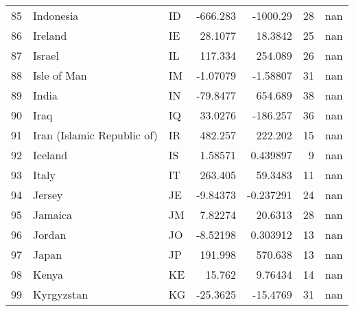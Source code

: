 \begin{tabular}{rllrrrr}
 85 & Indonesia                  & ID         & -666.283      & -1000.29      &     28 &          nan \\
 86 & Ireland                    & IE         &   28.1077     &    18.3842    &     25 &          nan \\
 87 & Israel                     & IL         &  117.334      &   254.089     &     26 &          nan \\
 88 & Isle of Man                & IM         &   -1.07079    &    -1.58807   &     31 &          nan \\
 89 & India                      & IN         &  -79.8477     &   654.689     &     38 &          nan \\
 90 & Iraq                       & IQ         &   33.0276     &  -186.257     &     36 &          nan \\
 91 & Iran (Islamic Republic of) & IR         &  482.257      &   222.202     &     15 &          nan \\
 92 & Iceland                    & IS         &    1.58571    &     0.439897  &      9 &          nan \\
 93 & Italy                      & IT         &  263.405      &    59.3483    &     11 &          nan \\
 94 & Jersey                     & JE         &   -9.84373    &    -0.237291  &     24 &          nan \\
 95 & Jamaica                    & JM         &    7.82274    &    20.6313    &     28 &          nan \\
 96 & Jordan                     & JO         &   -8.52198    &     0.303912  &     13 &          nan \\
 97 & Japan                      & JP         &  191.998      &   570.638     &     13 &          nan \\
 98 & Kenya                      & KE         &   15.762      &     9.76434   &     14 &          nan \\
 99 & Kyrgyzstan                 & KG         &  -25.3625     &   -15.4769    &     31 &          nan \\
\hline
\end{tabular}